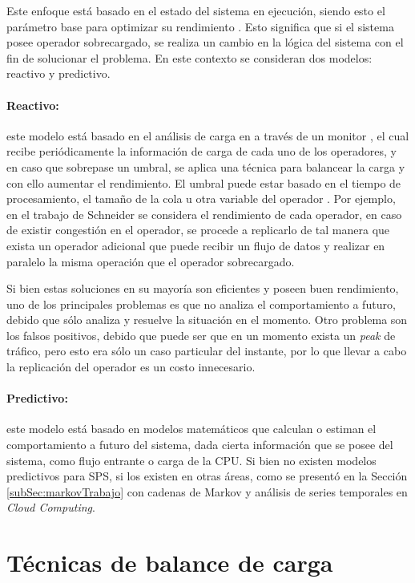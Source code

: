Este enfoque está basado en el estado del sistema en ejecución, siendo esto el parámetro base para optimizar su rendimiento \citep{CasavantK88}. Esto significa que si el sistema posee operador sobrecargado, se realiza un cambio en la lógica del sistema con el fin de solucionar el problema. En este contexto se consideran dos modelos: reactivo y predictivo.

\paragraph{Reactivo:} este modelo está basado en el análisis de carga en a través de un monitor \citep{GulisanoJPSV12}, el cual recibe periódicamente la información de carga de cada uno de los operadores, y en caso que sobrepase un umbral, se aplica una técnica para balancear la carga y con ello aumentar el rendimiento. El umbral puede estar basado en el tiempo de procesamiento, el tamaño de la cola u otra variable del operador \citep{BhuvanagiriGKS06}. Por ejemplo, en el trabajo de Schneider \citep{SchneiderAGBW09} se considera el rendimiento de cada operador, en caso de existir congestión en el operador, se procede a replicarlo de tal manera que exista un operador adicional que puede recibir un flujo de datos y realizar en paralelo la misma operación que el operador sobrecargado.

Si bien estas soluciones en su mayoría son eficientes y poseen buen rendimiento, uno de los principales problemas es que no analiza el comportamiento a futuro, debido que sólo analiza y resuelve la situación en el momento. Otro problema son los falsos positivos, debido que puede ser que en un momento exista un \textit{peak} de tráfico, pero esto era sólo un caso particular del instante, por lo que llevar a cabo la replicación del operador es un costo innecesario.

\paragraph{Predictivo:} este modelo está basado en modelos matemáticos que calculan o estiman el comportamiento a futuro del sistema, dada cierta información que se posee del sistema, como flujo entrante o carga de la CPU. Si bien no existen modelos predictivos para SPS, si los existen en otras áreas, como se presentó en la Sección \ref{subSec:markovTrabajo} con cadenas de Markov y análisis de series temporales en \textit{Cloud Computing}.

\section{Técnicas de balance de carga}
\label{sec:tecnicasBC}

